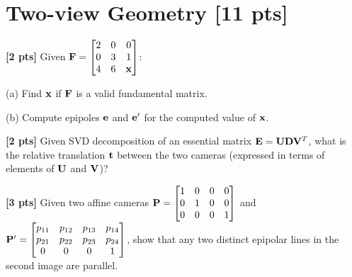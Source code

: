 \documentclass[11pt,addpoints,answers]{exam}
\numberwithin{equation}{section} %
\numberwithin{figure}{section} %
\numberwithin{table}{section} %
\begin{document}
\clearpage

\section{Two-view Geometry  [11 pts]}
\begin{questions}

\question \textbf{[2 pts]} Given $\mathbf{F} = \begin{bmatrix}
2 & 0 & 0 \\ 
0 & 3 & 1 \\ 
4 & 6 & \mathbf{x}
\end{bmatrix}$:

(a) Find $\mathbf{x}$ if $\mathbf{F}$ is a valid fundamental matrix.

(b) Compute epipoles $\mathbf{e}$ and $\mathbf{e}'$ for the computed value of $\mathbf{x}$.

\begin{tcolorbox}[fit,height=4.5cm, width=\textwidth, blank, borderline={0.5pt}{-2pt},halign=left, valign=center, nobeforeafter]


\end{tcolorbox}

\question \textbf{[2 pts]} Given SVD decomposition of an essential matrix $\mathbf{E} = \mathbf{U}\mathbf{D}\mathbf{V}^T$, what is the relative translation $\mathbf{t}$ between the two cameras (expressed in terms of elements of $\mathbf{U}$  and $\mathbf{V}$)?

\begin{tcolorbox}[fit,height=4.5cm, width=\textwidth, blank, borderline={0.5pt}{-2pt},halign=left, valign=center, nobeforeafter]


\end{tcolorbox}

\question \textbf{[3 pts]} Given two affine cameras $\mathbf{P} = \begin{bmatrix}
1 & 0 & 0 & 0 \\ 
0 & 1 & 0 & 0 \\
0 & 0 & 0 & 1
\end{bmatrix}$ and $\mathbf{P}' = \begin{bmatrix}
p_{11} & p_{12} & p_{13} & p_{14} \\ 
p_{21} & p_{22} & p_{23} & p_{24} \\ 
0 & 0 & 0 & 1
\end{bmatrix}$, show that any two distinct epipolar lines in the second image are parallel.

\begin{tcolorbox}[fit,height=4.5cm, width=\textwidth, blank, borderline={0.5pt}{-2pt},halign=left, valign=center, nobeforeafter]



\end{tcolorbox}
\end{questions}
\end{document}
